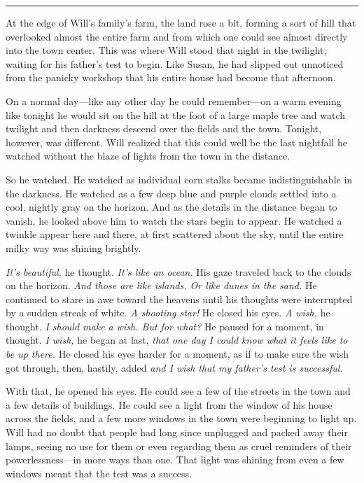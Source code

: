 \documentclass[12pt,letterpaper,oneside,english]{book}
\begin{document}
\medskip
{\centering\rule{\linewidth}{1pt}}
\smallskip

At the edge of Will's family's farm, the land rose a bit, forming a sort
of hill that overlooked almost the entire farm and from which one could
see almost directly into the town center. This was where Will stood that
night in the twilight, waiting for his father's test to begin. Like
Susan, he had slipped out unnoticed from the panicky workshop that his
entire house had become that afternoon.

On a normal day---like any other day he could remember---on a warm evening
like tonight he would sit on the hill at the foot of a large maple tree
and watch twilight and then darkness descend over the fields and the town.
Tonight, however, was different. Will realized that this could well be the
last nightfall he watched without the blaze of lights from the town in the
distance.

So he watched. He watched as individual corn stalks became
indistinguishable in the darkness. He watched as a few deep blue and
purple clouds settled into a cool, nightly gray on the horizon. And as
the details in the distance began to vanish, he looked above him to
watch the stars begin to appear. He watched a twinkle appear here and
there, at first scattered about the sky, until the entire milky way
was shining brightly.

\textit{It's beautiful,} he thought. \textit{It's like an ocean.} His gaze
traveled back to the clouds on the horizon. \textit{And those are like
islands. Or like dunes in the sand.} He continued to stare in awe toward
the heavens until his thoughts were interrupted by a sudden streak of
white. \textit{A shooting star!} He closed his eyes. \textit{A wish,} he
thought. \textit{I should make a wish. But for what?} He paused for a
moment, in thought. \textit{I wish,} he began at last, \textit{that one
day I could know what it feels like to be up there.} He closed his eyes
harder for a moment, as if to make sure the wish got through, then,
hastily, added \textit{and I wish that my father's test is successful.}

With that, he opened his eyes. He could see a few of the streets in the
town and a few details of buildings. He could see a light from the window
of his house across the fields, and a few more windows in the town were
beginning to light up. Will had no doubt that people had long since
unplugged and packed away their lamps, seeing no use for them or even
regarding them as cruel reminders of their powerlessness---in more ways
than one. That light was shining from even a few windows meant that the
test was a success.
\end{document}
